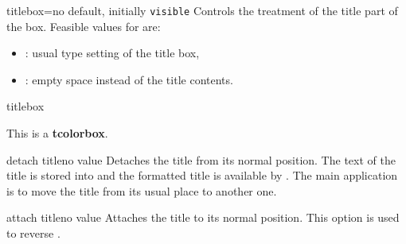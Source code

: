 \begin{docTcbKey}[][doc new=2019-03-01]{titlebox}{=}{no default, initially \texttt{visible}}
  Controls the treatment of the title part of the box.
  Feasible values for  are:
  \begin{itemize}
  \item{}: usual type setting of the title box,
  \item{}: empty space instead of the title contents.
  \end{itemize}
\begin{exdispExample}{titlebox}
\begin{tcolorbox}[title=My invisible title,
  titlebox=invisible]
This is a \textbf{tcolorbox}.
\end{tcolorbox}
\end{exdispExample}
\end{docTcbKey}



\clearpage
\begin{docTcbKey}{detach title}{}{no value}
Detaches the title from its normal position. The text of the title is
stored into  and the formatted title is
available by .
The main application is to move the title from its usual place to another one.
\end{docTcbKey}

\begin{docTcbKey}{attach title}{}{no value}
Attaches the title to its normal position. This option is used to reverse
.
\end{docTcbKey}


